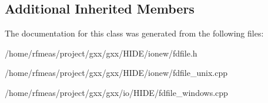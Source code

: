 \subsection*{Additional Inherited Members}


The documentation for this class was generated from the following files\+:\begin{DoxyCompactItemize}
\item 
/home/rfmeas/project/gxx/gxx/\+H\+I\+D\+E/ionew/fdfile.\+h\item 
/home/rfmeas/project/gxx/gxx/\+H\+I\+D\+E/ionew/fdfile\+\_\+unix.\+cpp\item 
/home/rfmeas/project/gxx/gxx/io/\+H\+I\+D\+E/fdfile\+\_\+windows.\+cpp\end{DoxyCompactItemize}
